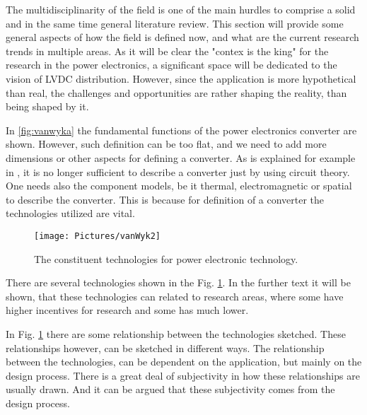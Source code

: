 \documentclass[]{scrartcl}
\begin{document}

The multidisciplinarity of the field is one of the main hurdles to comprise a solid and in the same time general literature review. This section will provide some general aspects of how the field is defined now, and what are the current research trends in multiple areas. As it will be clear the "contex is the king" for the research in the power electronics, a significant space will be dedicated to the vision of LVDC distribution. However, since the application is more hypothetical than real, the challenges and opportunities are rather shaping the reality, than being shaped by it. 

In \ref{fig:vanwyka} the fundamental functions of the power electronics converter are shown. However, such definition can be too flat, and we need to add more dimensions or other aspects for defining a converter. As is explained for example in \cite{Ferreira2001}, it is no longer sufficient to describe a converter just by using circuit theory. One needs also the component models, be it thermal, electromagnetic or spatial to describe the converter. This is because for definition of a converter the technologies utilized are vital. 

\begin{figure}[h!]
\centering
\texttt{[image: Pictures/vanWyk2]}
\caption{The constituent technologies for power electronic technology.}
\label{fig:vanwyk2}
\end{figure}


There are several technologies shown in the Fig. \ref{fig:vanwyk2}. In the further text it will be shown, that these technologies can related to research areas, where some have higher incentives for research and some has much lower. 

In Fig. \ref{fig:vanwyk2} there are some relationship between the technologies sketched. These relationships however, can be sketched in different ways. The relationship between the technologies, can be dependent on the application, but mainly on the design process. There is a great deal of subjectivity in how these relationships are usually drawn. And it can be argued that these subjectivity comes from the design process. 
\end{document}
